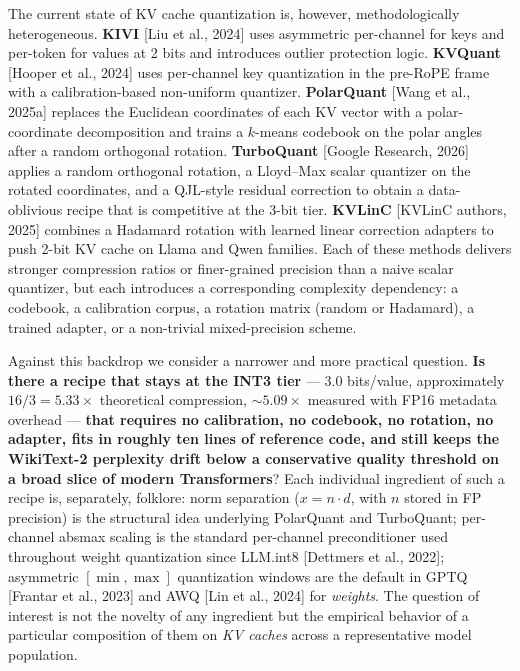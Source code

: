 \documentclass[
]{article}
\begin{document}
The current state of KV cache quantization is, however, methodologically
heterogeneous. \textbf{KIVI} {[}Liu et al., 2024{]} uses asymmetric
per-channel for keys and per-token for values at 2 bits and introduces
outlier protection logic. \textbf{KVQuant} {[}Hooper et al., 2024{]}
uses per-channel key quantization in the pre-RoPE frame with a
calibration-based non-uniform quantizer. \textbf{PolarQuant} {[}Wang et
al., 2025a{]} replaces the Euclidean coordinates of each KV vector with
a polar-coordinate decomposition and trains a \(k\)-means codebook on
the polar angles after a random orthogonal rotation. \textbf{TurboQuant}
{[}Google Research, 2026{]} applies a random orthogonal rotation, a
Lloyd--Max scalar quantizer on the rotated coordinates, and a QJL-style
residual correction to obtain a data-oblivious recipe that is
competitive at the 3-bit tier. \textbf{KVLinC} {[}KVLinC authors,
2025{]} combines a Hadamard rotation with learned linear correction
adapters to push 2-bit KV cache on Llama and Qwen families. Each of
these methods delivers stronger compression ratios or finer-grained
precision than a naive scalar quantizer, but each introduces a
corresponding complexity dependency: a codebook, a calibration corpus, a
rotation matrix (random or Hadamard), a trained adapter, or a
non-trivial mixed-precision scheme.

Against this backdrop we consider a narrower and more practical
question. \textbf{Is there a recipe that stays at the INT3 tier} --- 3.0
bits/value, approximately \(16/3 = 5.33\times\) theoretical compression,
\(\sim\!5.09\times\) measured with FP16 metadata overhead ---
\textbf{that requires no calibration, no codebook, no rotation, no
adapter, fits in roughly ten lines of reference code, and still keeps
the WikiText-2 perplexity drift below a conservative quality threshold
on a broad slice of modern Transformers}? Each individual ingredient of
such a recipe is, separately, folklore: norm separation
(\(x = n \cdot d\), with \(n\) stored in FP precision) is the structural
idea underlying PolarQuant and TurboQuant; per-channel absmax scaling is
the standard per-channel preconditioner used throughout weight
quantization since LLM.int8 {[}Dettmers et al., 2022{]}; asymmetric
\([\min, \max]\) quantization windows are the default in GPTQ {[}Frantar
et al., 2023{]} and AWQ {[}Lin et al., 2024{]} for \emph{weights}. The
question of interest is not the novelty of any ingredient but the
empirical behavior of a particular composition of them on \emph{KV
caches} across a representative model population.
\end{document}
